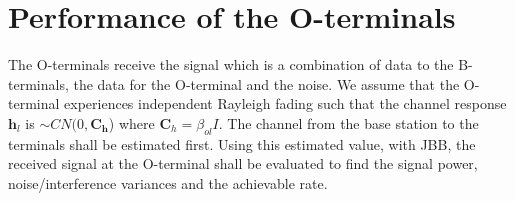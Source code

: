 \documentclass[10pt, a4paper, twoside,fleqn]{article}
\begin{document}

\section{Performance of the O-terminals}
	The O-terminals receive the signal which is a combination of data to the B-terminals, the data for the O-terminal and the noise. We assume that the O-terminal experiences independent Rayleigh fading such that the channel response $\pmb{h}_{l}$ is $\sim CN(0,\pmb{C_h}$) where $\pmb{C}_h = \beta_{ol}I$. The channel from the base station to the terminals shall be estimated first. Using this estimated value, with JBB, the received signal at the O-terminal shall be evaluated to find the signal power, noise/interference variances and the achievable rate.
\end{document}
